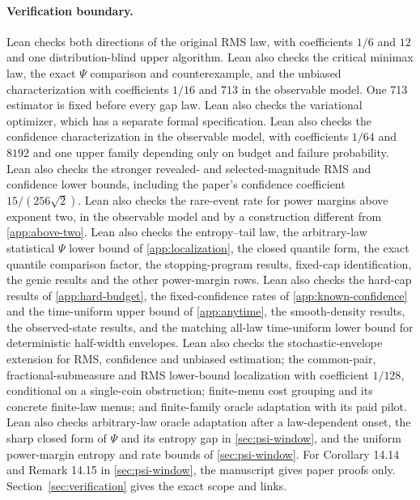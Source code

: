 \paragraph{Verification boundary.}
Lean checks both directions of the original RMS law, with coefficients
$1/6$ and $12$ and one distribution-blind upper algorithm. Lean also
checks the critical minimax law, the exact $\Psi$ comparison and
counterexample, and the unbiased characterization with coefficients $1/16$
and $713$ in the observable model. One 713 estimator is fixed before every
gap law. Lean also checks the variational optimizer, which has a separate
formal specification. Lean also checks the confidence characterization in
the observable model, with coefficients $1/64$ and $8192$ and one upper
family depending only on budget and failure probability. Lean also checks
the stronger revealed- and selected-magnitude RMS and confidence lower
bounds, including the paper's confidence coefficient $15/(256\sqrt2)$.
Lean also checks the rare-event rate for power margins above exponent two,
in the observable model and by a construction different from
\cref{app:above-two}. Lean also checks the entropy--tail law, the
arbitrary-law statistical $\Psi$ lower bound of \cref{app:localization},
the closed quantile form, the exact quantile comparison factor, the
stopping-program results, fixed-cap identification, the genie results and
the other power-margin rows. Lean also checks the hard-cap results of
\cref{app:hard-budget}, the fixed-confidence rates of
\cref{app:known-confidence} and the time-uniform upper bound of
\cref{app:anytime}, the smooth-density results, the observed-state
results, and the matching all-law time-uniform lower bound for
deterministic half-width envelopes. Lean also checks the
stochastic-envelope extension for RMS, confidence and unbiased estimation;
the common-pair, fractional-submeasure and RMS lower-bound localization
with coefficient $1/128$, conditional on a single-coin obstruction;
finite-menu cost grouping and its concrete finite-law menus; and
finite-family oracle adaptation with its paid pilot. Lean also checks
arbitrary-law oracle adaptation after a law-dependent onset, the sharp
closed form of $\Psi$ and its entropy gap in \cref{sec:psi-window}, and
the uniform power-margin entropy and rate bounds of \cref{sec:psi-window}.
For Corollary 14.14 and Remark 14.15 in \cref{sec:psi-window}, the
manuscript gives paper proofs only. Section~\ref{sec:verification} gives
the exact scope and links.
